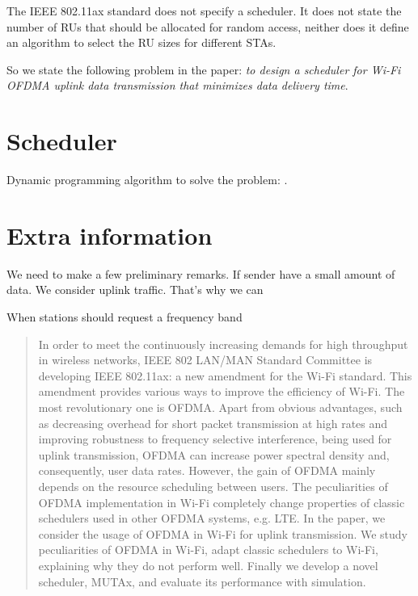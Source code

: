 The IEEE 802.11ax standard does not specify a scheduler.
It does not state the number of RUs that should be allocated for random access, neither does it define an algorithm to select the RU sizes for different STAs.

So we state the following problem in the paper: \emph{to design a scheduler for Wi-Fi OFDMA uplink data transmission that minimizes data delivery time}.

\section{Scheduler}
Dynamic programming algorithm to solve the problem: \cite{bourgeois1971extension}.
\section{Extra information}

We need to make a few preliminary remarks. If sender have a small amount of data. We consider uplink traffic. That's why we can 

When stations should request a frequency band

\clearpage

\clearpage

\begin{abstract}
	In order to meet the continuously increasing demands for high throughput in wireless networks, IEEE 802 LAN/MAN Standard Committee is developing IEEE 802.11ax: a new amendment for the Wi-Fi standard.
	This amendment provides various ways to improve the efficiency of Wi-Fi. The most revolutionary one is OFDMA.
	Apart from obvious advantages, such as decreasing overhead for short packet transmission at high rates and improving robustness to frequency selective interference, being used for uplink transmission, OFDMA can increase power spectral density and, consequently, user data rates. However, the gain of OFDMA mainly depends on the resource scheduling between users.
	The peculiarities of OFDMA implementation in Wi-Fi completely change properties of classic schedulers used in other OFDMA systems, e.g. LTE. 
	In the paper, we consider the usage of OFDMA in Wi-Fi for uplink transmission.
	We study peculiarities of OFDMA in Wi-Fi, adapt classic schedulers to Wi-Fi, explaining why they do not perform well.
	Finally we develop a novel scheduler, MUTAx, and evaluate its performance with simulation. 
\end{abstract}

